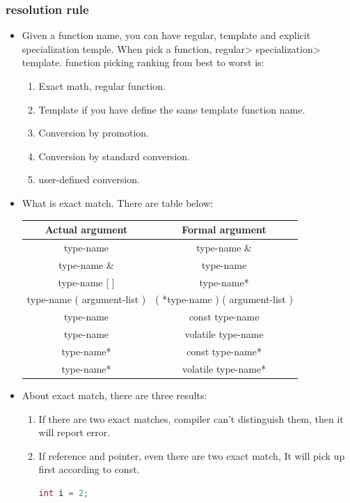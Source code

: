 \documentclass[a4paper,11pt,twoside]{book}
\newcommand{\tophline}{\hline }
\newcommand{\bottomhline}{\\ \hline }
\newcommand{\tophline}{ }
\newcommand{\bottomhline}{ }
\begin{document}
\subsubsection{resolution rule}
\begin{itemize}
	\item Given a function name, you can have regular, template and explicit specialization temple. When pick a function, regular> specialization> template. function picking ranking from best to worst is:
	\begin{enumerate}
		\item Exact math, regular function.
		\item Template if you have define the same template function name.
		\item Conversion by promotion.
		\item Conversion by standard conversion.
		\item user-defined conversion.
	\end{enumerate}

\item What is exact match. There are table below:

\begin{center}
	\begin{tabular}{|c|c|}
	\tophline
	Actual argument & Formal argument \\
	\tophline
	type-name & type-name \& \\
	\tophline
	type-name \& & type-name \\ \tophline
	type-name [ ] &  type-name* \\ \tophline
	type-name ( argument-list ) & ( *type-name ) ( argument-list ) \\ \tophline
	type-name  & const type-name \\ \tophline
	type-name  &  volatile  type-name \\ \tophline
	type-name*  & const type-name*  \\ \tophline
	type-name*  & volatile  type-name*  \bottomhline
	\end{tabular}
\end{center}

	\item About exact match, there are three results:
	\begin{enumerate}
		\item If there are two exact matches, compiler can't distinguish them, then it will report error.
		
		\item If reference and pointer, even there are two exact match, It will pick up first according to const.
\begin{lstlisting}[frame=single, language=c++]
int i = 2;


\end{lstlisting}
\end{enumerate}
\end{itemize}
\end{document}
